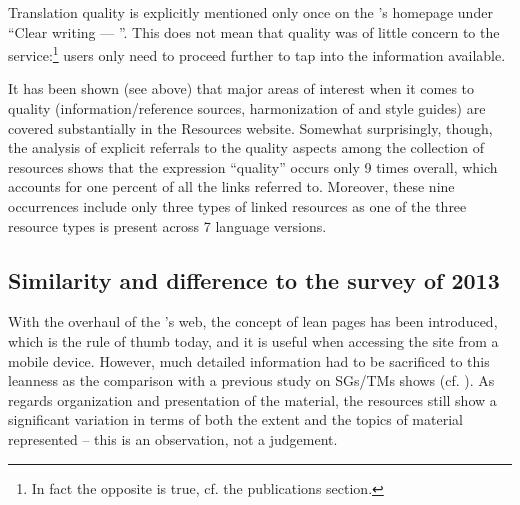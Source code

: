 \documentclass[output=paper]{langsci/langscibook}
\begin{document}
Translation quality is explicitly mentioned only once on the ’s homepage under “Clear writing — ”. This does not mean that quality was of little concern to the service:\footnote{In fact the opposite is true, cf. the publications section.} users only need to proceed further to tap into the information available.

It has been shown (see above) that major areas of interest when it comes to  quality (information/reference sources, harmonization of  and style guides) are covered substantially in the Resources website. Somewhat surprisingly, though, the analysis of explicit referrals to the quality aspects among the collection of resources shows that the expression “quality” occurs only 9 times overall, which accounts for one percent of all the links referred to. Moreover, these nine occurrences include only three types of linked resources as one of the three resource types is present across 7 language versions.

\subsection{Similarity and difference to the survey of 2013}\label{sec:svoboda:5.3}

With the overhaul of the ’s web, the concept of lean pages has been introduced, which is the rule of thumb today, and it is useful when accessing the site from a mobile device. However, much detailed information had to be sacrificed to this leanness as the comparison with a previous study on SGs/TMs shows (cf. \citealt{Svoboda2013}). As regards organization and presentation of the material, the  resources still show a significant variation in terms of both the extent and the topics of material represented – this is an observation, not a judgement.
\end{document}
